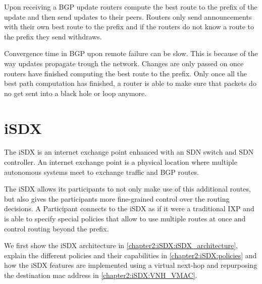 Upon receiving a BGP update routers compute the best route to the prefix of the update and then send updates to their peers. Routers only send announcements with their own best route to the prefix and if the routers do not know a route to the prefix they send withdraws.

Convergence time in BGP upon remote failure can be slow.
This is because of the way updates propagate trough the network. Changes are only passed on once routers have finished computing the best route to the prefix. Only once all the best path computation has finished, a router is able to make sure that packets do no get sent into a black hole or loop anymore.



\section{\label{chapter2:iSDX}iSDX}

The iSDX is an internet exchange point enhanced with an SDN switch and SDN controller.
An internet exchange point is a physical location where multiple autonomous systems meet to exchange traffic and BGP routes.  

The iSDX allows its participants to not only make use of this additional routes, but also gives the participants  more fine-grained control over the routing decisions. A Participant connects to the iSDX as if it were a traditional IXP and is able to specify special policies that allow to use multiple routes at once and control routing beyond the prefix.

We first show the iSDX architecture in \ref{chapter2:iSDX:iSDX_architecture}, explain the different policies and their capabilities in \ref{chapter2:iSDX:policies} and how the iSDX features are implemented using a virtual next-hop and repurposing the destination mac address in \ref{chapter2:iSDX:VNH_VMAC}.

